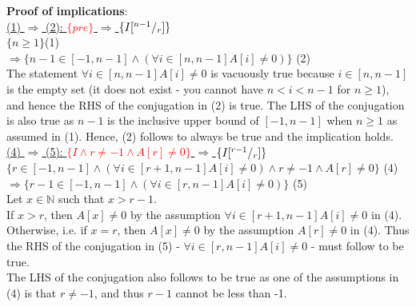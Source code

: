 \documentclass[a4paper]{article}
\begin{document}
\begin{enumerate}
\textbf{Proof of implications}:\\
\vspace{8mm}
\underline{(1) \(\Rightarrow\) (2): \textcolor{red}{\(\{pre\}\)} \(\Rightarrow\) \textcolor{red}{\(\{I[^{n-1}/_{r}] \}\)}} \\
\vspace{4mm}
\qquad\( \{n \geq 1\} \)\hfill (1)\\
\vspace{2mm}
\qquad\qquad \(\Rightarrow \{n-1 \in [-1,n-1] \wedge (\forall i \in [n,n-1]A[i]\neq 0)\} \) \hfill (2) \\
\vspace{3mm}
The statement \(\forall i \in [n,n-1]A[i]\neq 0\) is vacuously true because \(i \in [n, n-1]\) is the empty set (it does not exist - you cannot have \( n < i < n - 1\) for \(n \geq 1\)), and hence the RHS of the conjugation in (2) is true. The LHS of the conjugation is also true as \(n-1\) is the inclusive upper bound of \([-1, n-1]\) when \(n \geq 1\) as assumed in (1). Hence, (2) follows to always be true and the implication holds.\\
\vspace{10mm}
\underline{(4) \(\Rightarrow\) (5): \textcolor{red}{\( \{ I \wedge r\neq -1 \wedge A[r]\neq 0 \}\)} \(\Rightarrow\) \textcolor{red}{\(\{ I[^{r-1}/_{r}] \} \)}} \\
\vspace{4mm}
\qquad\( \{ r \in [-1,n-1] \wedge (\forall i \in [r+1,n-1]A[i]\neq 0) \wedge r\neq -1 \wedge A[r]\neq 0 \}\) \hfill (4) \\
\vspace{2mm}
\qquad\qquad \( \Rightarrow \{ r-1 \in [-1,n-1] \wedge (\forall i \in [r,n-1]A[i]\neq 0)\} \) \hfill (5) \\
\vspace{3mm}
Let \(x \in \mathbb{N}\) such that \( x > r - 1\).\\
\vspace{2mm}
If \( x > r\), then \(A[x] \neq 0 \) by the assumption \(\forall i \in [r+1,n-1]A[i]\neq 0\) in (4). Otherwise, i.e. if \(x = r\), then \(A[x] \neq 0\) by the assumption \(A[r] \neq 0\) in (4). Thus the RHS of the conjugation in (5) - \(\forall i \in [r,n-1]A[i]\neq 0\) - must follow to be true.\\
\vspace{2mm}
The LHS of the conjugation also follows to be true as one of the assumptions in (4) is that \( r\neq -1\), and thus \(r - 1\) cannot be less than -1.\\

\end{enumerate}
\end{document}

